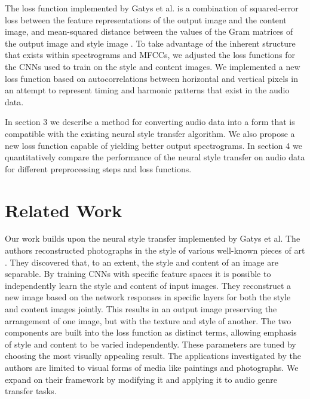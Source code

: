 \documentclass{article}
\begin{document}
The loss function implemented by Gatys et al. is a combination of squared-error loss between the feature representations of the output image and the content image, and mean-squared distance between the values of the Gram matrices of the output image and style image \citep{Gatys2015}. To take advantage of the inherent structure that exists within spectrograms and MFCCs, we adjusted the loss functions for the CNNs used to train on the style and content images. We implemented a new loss function based on autocorrelations between horizontal and vertical pixels in an attempt to represent timing and harmonic patterns that exist in the audio data.

In section 3 we describe a method for converting audio data into a form that is compatible with the existing neural style transfer algorithm. We also propose a new loss function capable of yielding better output spectrograms. In section 4 we quantitatively compare the performance of the neural style transfer on audio data for different preprocessing steps and loss functions.


\section{Related Work}

Our work builds upon the neural style transfer implemented by Gatys et al. The authors reconstructed photographs in the style of various well-known pieces of art \citep{Gatys2015}. They discovered that, to an extent, the style and content of an image are separable. By training CNNs with specific feature spaces it is possible to independently learn the style and content of input images. They reconstruct a new image based on the network responses in specific layers for both the style and content images jointly. This results in an output image preserving the arrangement of one image, but with the texture and style of another. The two components are built into the loss function as distinct terms, allowing emphasis of style and content to be varied independently. These parameters are tuned by choosing the most visually appealing result. The applications investigated by the authors are limited to visual forms of media like paintings and photographs. We expand on their framework by modifying it and applying it to audio genre transfer tasks.
\end{document}
